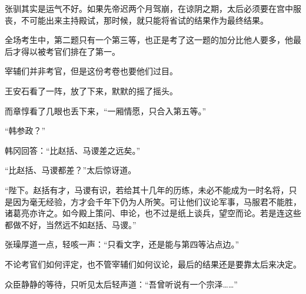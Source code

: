 张驯其实是运气不好。如果先帝迟两个月驾崩，在谅阴之期，太后必须要在宫中服丧，不可能出来主持殿试，那时候，就只能将省试的结果作为最终结果。

全场考生中，第二题只有一个第三等，也正是考了这一题的加分比他人要多，他最后才得以被考官们排在了第一。

宰辅们并非考官，但是这份考卷也要他们过目。

王安石看了一阵，放了下来，默默的摇了摇头。

而章惇看了几眼也丢下来，“一厢情愿，只合入第五等。”

“韩参政？”

韩冈回答：“比赵括、马谡差之远矣。”

“比赵括、马谡都差？”太后惊讶道。

“陛下。赵括有才，马谡有识，若给其十几年的历练，未必不能成为一时名将，只是因为毫无经验，方才会千年下仍为人所笑。可让他们议论军事，马服君不能胜，诸葛亮亦许之。如今殿上策问、申论，也不过是纸上谈兵，望空而论。若是连这些都做不好，当然远不如赵括、马谡。”

张璪厚道一点，轻咳一声：“只看文字，还是能与第四等沾点边。”

不论考官们如何评定，也不管宰辅们如何议论，最后的结果还是要靠太后来决定。

众臣静静的等待，只听见太后轻声道：“吾曾听说有一个宗泽……”
